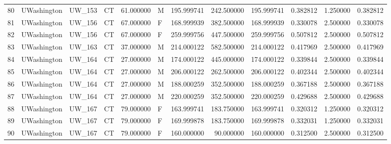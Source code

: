 \begin{tabular}{llllrlrrrrrr}
80     &     UWashington &       UW\_153 &                 CT &  61.000000 &        M &       195.999741 &    242.500000 &  195.999741 &               0.382812 &            1.250000 &          0.382812 \\
81     &     UWashington &       UW\_156 &                 CT &  67.000000 &        F &       168.999939 &    382.500000 &  168.999939 &               0.330078 &            2.500000 &          0.330078 \\
82     &     UWashington &       UW\_156 &                 CT &  67.000000 &        F &       259.999756 &    447.500000 &  259.999756 &               0.507812 &            2.500000 &          0.507812 \\
83     &     UWashington &       UW\_163 &                 CT &  37.000000 &        M &       214.000122 &    582.500000 &  214.000122 &               0.417969 &            2.500000 &          0.417969 \\
84     &     UWashington &       UW\_164 &                 CT &  27.000000 &        M &       174.000122 &    445.000000 &  174.000122 &               0.339844 &            2.500000 &          0.339844 \\
85     &     UWashington &       UW\_164 &                 CT &  27.000000 &        M &       206.000122 &    262.500000 &  206.000122 &               0.402344 &            2.500000 &          0.402344 \\
86     &     UWashington &       UW\_164 &                 CT &  27.000000 &        M &       188.000259 &    352.500000 &  188.000259 &               0.367188 &            2.500000 &          0.367188 \\
87     &     UWashington &       UW\_164 &                 CT &  27.000000 &        M &       220.000259 &    352.500000 &  220.000259 &               0.429688 &            2.500000 &          0.429688 \\
88     &     UWashington &       UW\_167 &                 CT &  79.000000 &        F &       163.999741 &    183.750000 &  163.999741 &               0.320312 &            1.250000 &          0.320312 \\
89     &     UWashington &       UW\_167 &                 CT &  79.000000 &        F &       169.999878 &    183.750000 &  169.999878 &               0.332031 &            1.250000 &          0.332031 \\
90     &     UWashington &       UW\_167 &                 CT &  79.000000 &        F &       160.000000 &     90.000000 &  160.000000 &               0.312500 &            2.500000 &          0.312500 \\

\end{tabular}
